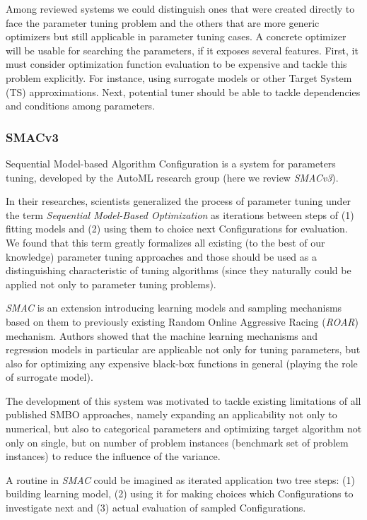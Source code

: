 Among reviewed systems we could distinguish ones that were created directly to face the parameter tuning problem and the others that are more generic optimizers but still applicable in parameter tuning cases.
A concrete optimizer will be usable for searching the parameters, if it exposes several features. First, it must consider optimization function evaluation to be expensive and tackle this problem explicitly. For instance, using surrogate models or other Target System (TS) approximations. Next, potential tuner should be able to tackle dependencies and conditions among parameters.

\subsubsection{SMACv3~\cite{hutter2011sequential}}\label{bg: smac}
Sequential Model-based Algorithm Configuration is a system for parameters tuning, developed by the AutoML research group (here we review \textit{SMACv3}). 

In their researches, scientists generalized the process of parameter tuning under the term \textit{Sequential Model-Based Optimization} as iterations between steps of (1) fitting models and (2) using them to choice next Configurations for evaluation. 
We found that this term greatly formalizes all existing (to the best of our knowledge) parameter tuning approaches and those should be used as a distinguishing characteristic of tuning algorithms (since they naturally could be applied not only to parameter tuning problems).

\textit{SMAC} is an extension introducing learning models and sampling mechanisms based on them to previously existing Random Online Aggressive Racing (\textit{ROAR}) mechanism. Authors showed that the machine learning mechanisms and regression models in particular are applicable not only for tuning parameters, but also for optimizing any expensive black-box functions in general (playing the role of surrogate model). 

The development of this system was motivated to tackle existing limitations of all published SMBO approaches, namely expanding an applicability not only to numerical, but also to categorical parameters and optimizing target algorithm not only on single, but on number of problem instances (benchmark set of problem instances) to reduce the influence of the variance.

A routine in \textit{SMAC} could be imagined as iterated application two tree steps: (1) building learning model, (2) using it for making choices which Configurations to investigate next and (3) actual evaluation of sampled Configurations.

